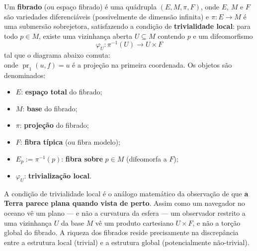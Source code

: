 \begin{defi}[Fibrado]\label{def:fibrado}
Um \textbf{fibrado} (ou espa\c{c}o fibrado) \'e uma qu\'adrupla
$(E, M, \pi, F)$, onde $E$, $M$ e $F$ s\~ao variedades diferenci\'aveis
(possivelmente de dimens\~ao infinita) e $\pi: E \to M$ \'e uma submers\~ao
sobrejetora, satisfazendo a condi\c{c}\~ao de \textbf{trivialidade local}:
para todo $p \in M$, existe uma vizinhan\c{c}a aberta $U \subseteq M$ contendo
$p$ e um difeomorfismo
\begin{equation}\label{eq:trivializacao}
 \varphi_U: \pi^{-1}(U) \to U \times F
\end{equation}
tal que o diagrama abaixo comuta:
\begin{equation}\label{eq:diagrama_triv}
 
\end{equation}
onde $\operatorname{pr}_1(u, f) = u$ \'e a proje\c{c}\~ao na primeira
coordenada. Os objetos s\~ao denominados:
\begin{itemize}
 \item $E$: \textbf{espa\c{c}o total} do fibrado;
 \item $M$: \textbf{base} do fibrado;
 \item $\pi$: \textbf{proje\c{c}\~ao} do fibrado;
 \item $F$: \textbf{fibra t\'ipica} (ou fibra modelo);
 \item $E_p := \pi^{-1}(p)$: \textbf{fibra sobre} $p \in M$ (difeomorfa a $F$);
 \item $\varphi_U$: \textbf{trivializa\c{c}\~ao local}.
\end{itemize}
\end{defi}

\begin{obs}
A condi\c{c}\~ao de trivialidade local \'e o an\'alogo matem\'atico da
observa\c{c}\~ao de que \textbf{a Terra parece plana quando vista de perto}.
Assim como um navegador no oceano v\^e um plano --- e n\~ao a curvatura da
esfera --- um observador restrito a uma vizinhan\c{c}a $U$ da base $M$ v\^e um
produto cartesiano $U \times F$, e n\~ao a tor\c{c}\~ao global do fibrado. A
riqueza dos fibrados reside precisamente na discrep\^ancia entre a estrutura
local (trivial) e a estrutura global (potencialmente n\~ao-trivial).
\end{obs}

